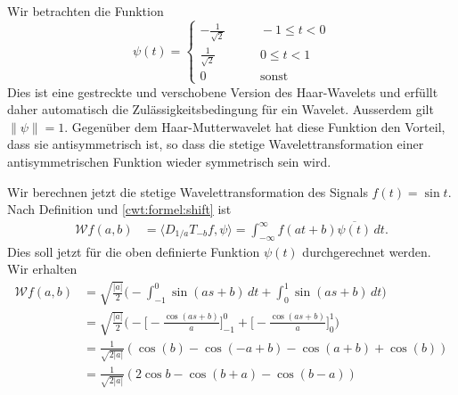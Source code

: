 \begin{beispiel}
Wir betrachten die Funktion
\begin{equation}
\psi(t) = \begin{cases}
-\frac1{\sqrt{2}}&\qquad -1\le t< 0\\
\frac1{\sqrt{2}}&\qquad 0\le t< 1\\
0&\qquad\text{sonst}
\end{cases}
\label{cwt:beispiel:psi}
\end{equation}
Dies ist eine gestreckte und verschobene Version des Haar-Wavelets
und erfüllt daher automatisch die Zulässigkeitsbedingung für ein Wavelet.
Ausserdem gilt $\|\psi\|=1$.
Gegenüber dem Haar-Mutterwavelet hat diese Funktion den Vorteil, dass 
sie antisymmetrisch ist, so dass die stetige Wavelettransformation
einer antisymmetrischen Funktion wieder symmetrisch sein wird.

Wir berechnen jetzt die stetige Wavelettransformation des Signals $f(t)=\sin t$.
Nach Definition und
\eqref{cwt:formel:shift}
ist
\begin{align*}
\mathcal{W}f(a,b)
&=
\langle D_{1/a}T_{-b}f,\psi\rangle
=
\int_{-\infty}^\infty f(at+b) \overline{\psi(t)}\,dt.
\end{align*}
Dies soll jetzt für die oben definierte Funktion $\psi(t)$ durchgerechnet
werden.
Wir erhalten
\begin{align*}
\mathcal{W}f(a,b)
&=
\sqrt{\frac{|a|}{2}}
\biggl(
-
\int_{-1}^0 \sin(as+b)\,dt
+
\int_{0}^1 \sin(as+b)\,dt
\biggr)
\\
&=
\sqrt{\frac{|a|}{2}}
\biggl(
-
\biggl[-\frac{\cos(as+b)}{a}\biggr]_{-1}^0
+
\biggl[-\frac{\cos(as+b)}{a}\biggr]_{0}^1
\biggr)
\\
&=
\frac{1}{\sqrt{2|a|}}
(
\cos(b) - \cos(-a+b) -\cos(a+b)+\cos(b)
)
\\
&=
\frac{1}{\sqrt{2|a|}}
(2\cos b - \cos(b+a) - \cos(b-a))
\end{align*}


\end{beispiel}
